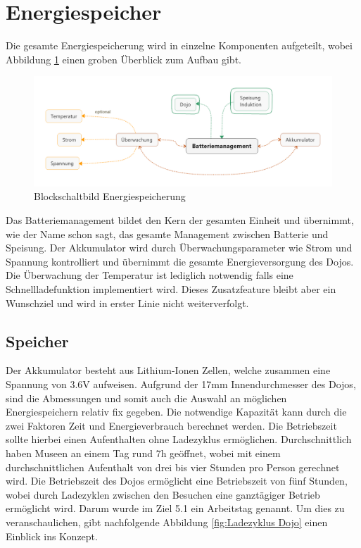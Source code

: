 \section{Energiespeicher}

Die gesamte Energiespeicherung wird in einzelne Komponenten aufgeteilt, wobei Abbildung \ref{fig:blockschaltbild} einen groben Überblick zum Aufbau gibt.

\begin{figure}[H]
	\begin{center}
		\includegraphics[width=160mm]{data/Batteriemanagement.png}
		\caption{Blockschaltbild Energiespeicherung} %
		\label{fig:blockschaltbild}
	\end{center}
\end{figure}

Das Batteriemanagement bildet den Kern der gesamten Einheit und übernimmt, wie der Name schon sagt, das gesamte Management zwischen Batterie und Speisung. Der Akkumulator wird durch Überwachungsparameter wie Strom und Spannung kontrolliert und übernimmt die gesamte Energieversorgung des Dojos. Die Überwachung der Temperatur ist lediglich notwendig falls eine Schnellladefunktion implementiert wird. Dieses Zusatzfeature bleibt aber ein Wunschziel und wird in erster Linie nicht weiterverfolgt.

\subsection{Speicher}
Der Akkumulator besteht aus Lithium-Ionen Zellen, welche zusammen eine Spannung von 3.6V aufweisen. Aufgrund der 17mm Innendurchmesser des Dojos, sind die Abmessungen und somit auch die Auswahl an möglichen Energiespeichern relativ fix gegeben. Die notwendige Kapazität kann durch die zwei Faktoren Zeit und Energieverbrauch berechnet werden. Die Betriebszeit sollte hierbei einen Aufenthalten ohne Ladezyklus ermöglichen. Durchschnittlich haben Museen an einem Tag rund 7h geöffnet, wobei mit einem durchschnittlichen Aufenthalt von drei bis vier Stunden pro Person gerechnet wird. Die Betriebszeit des Dojos ermöglicht eine Betriebszeit von fünf Stunden, wobei durch Ladezyklen zwischen den Besuchen eine ganztägiger Betrieb ermöglicht wird. Darum wurde im Ziel 5.1 ein Arbeitstag genannt. Um dies zu veranschaulichen, gibt nachfolgende Abbildung \ref{fig:Ladezyklus Dojo} einen Einblick ins Konzept.

